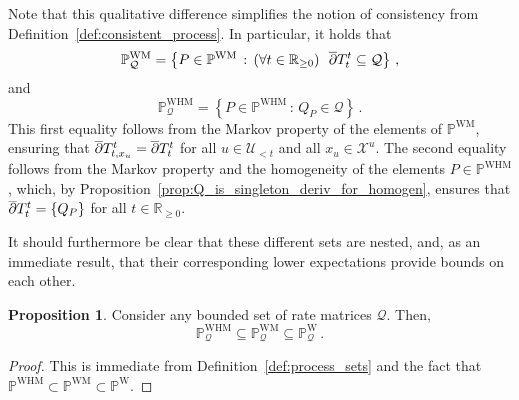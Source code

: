 \documentclass[10pt,a4paper]{paper}
\theoremstyle{definition}
\newtheorem{proposition}[theorem]{Proposition}
\newcommand{\reals}{\mathbb{R}}
\newcommand{\realsnonneg}{\reals_{\geq 0}}
\newcommand{\states}{\mathcal{X}}
\newcommand{\processes}{\mathbb{P}}
\newcommand{\wprocesses}{\processes^{\mathrm{W}}}
\newcommand{\wmprocesses}{\processes^{\mathrm{WM}}}
\newcommand{\whmprocesses}{\processes^{\mathrm{WHM}}}
\newcommand{\rateset}{\mathcal{Q}}
\begin{document}
Note that this qualitative difference simplifies the notion of consistency from Definition~\ref{def:consistent_process}. In particular, it holds that
\begin{equation*}
\wmprocesses_\rateset = \left\{P\in\wmprocesses\,:\,(\forall t\in\realsnonneg)~~ \smash{\overline{\partial}}T_t^t\subseteq\rateset\right\}\,,
\end{equation*}
and
\begin{equation*}
\whmprocesses_\rateset = \left\{P\in\whmprocesses\,:\,Q_P\in\rateset\right\}\,.
\end{equation*}
This first equality follows from the Markov property of the elements of $\wmprocesses$, ensuring that $\smash{\overline{\partial}}T_{t,x_u}^t=\smash{\overline{\partial}}T_t^t$ for all $u\in\mathcal{U}_{<t}$ and all $x_u\in\states^u$. The second equality follows from the Markov property and the homogeneity of the elements $P\in\whmprocesses$, which, by Proposition~\ref{prop:Q_is_singleton_deriv_for_homogen}, ensures that $\smash{\overline{\partial}}T_t^t=\{Q_P\}$ for all $t\in\realsnonneg$.

It should furthermore be clear that these different sets are nested, and, as an immediate result, that their corresponding lower expectations provide bounds on each other.

\begin{proposition}\label{prop:markov_set_subset_of_nonmarkov_set}
Consider any bounded set of rate matrices $\rateset$. Then,
\begin{equation*}
\whmprocesses_\rateset \subseteq \wmprocesses_\rateset \subseteq \wprocesses_\rateset\,.
\end{equation*}
\end{proposition}
\begin{proof}
This is immediate from Definition~\ref{def:process_sets} and the fact that $\whmprocesses\subset\wmprocesses\subset\wprocesses$.
\end{proof}
\end{document}
